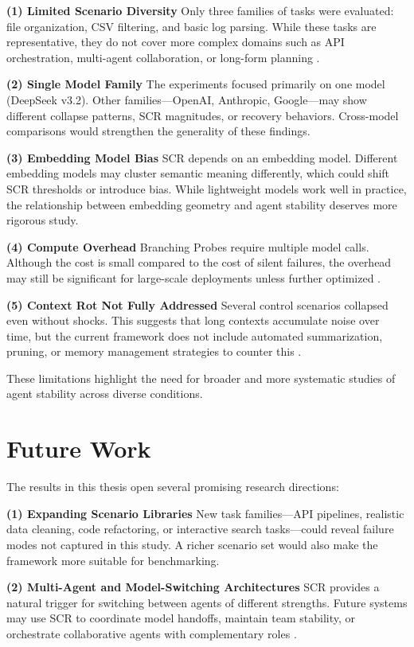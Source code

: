 \documentclass[12pt,a4paper]{report}
\begin{document}
\textbf{(1) Limited Scenario Diversity}
Only three families of tasks were evaluated: file organization, CSV filtering, and basic log parsing. While these tasks are representative, they do not cover more complex domains such as API orchestration, multi-agent collaboration, or long-form planning \cite{Jimenez2024SWEBenchPlus, Grattafiori2025MCPMark}.

\textbf{(2) Single Model Family}
The experiments focused primarily on one model (DeepSeek v3.2). Other families—OpenAI, Anthropic, Google—may show different collapse patterns, SCR magnitudes, or recovery behaviors. Cross-model comparisons would strengthen the generality of these findings.

\textbf{(3) Embedding Model Bias}
SCR depends on an embedding model. Different embedding models may cluster semantic meaning differently, which could shift SCR thresholds or introduce bias. While lightweight models work well in practice, the relationship between embedding geometry and agent stability deserves more rigorous study.

\textbf{(4) Compute Overhead}
Branching Probes require multiple model calls. Although the cost is small compared to the cost of silent failures, the overhead may still be significant for large-scale deployments unless further optimized \cite{Zhou2024Consistency}.

\textbf{(5) Context Rot Not Fully Addressed}
Several control scenarios collapsed even without shocks. This suggests that long contexts accumulate noise over time, but the current framework does not include automated summarization, pruning, or memory management strategies to counter this \cite{Wang2025ComplexityTrap, Chen2024HiAgent, Zhang2025ContextFolding}.

These limitations highlight the need for broader and more systematic studies of agent stability across diverse conditions.

\section{Future Work}
The results in this thesis open several promising research directions:

\textbf{(1) Expanding Scenario Libraries}
New task families—API pipelines, realistic data cleaning, code refactoring, or interactive search tasks—could reveal failure modes not captured in this study. A richer scenario set would also make the framework more suitable for benchmarking.

\textbf{(2) Multi-Agent and Model-Switching Architectures}
SCR provides a natural trigger for switching between agents of different strengths. Future systems may use SCR to coordinate model handoffs, maintain team stability, or orchestrate collaborative agents with complementary roles \cite{Chen2024HiAgent, Zhang2025ContextFolding}.
\end{document}
